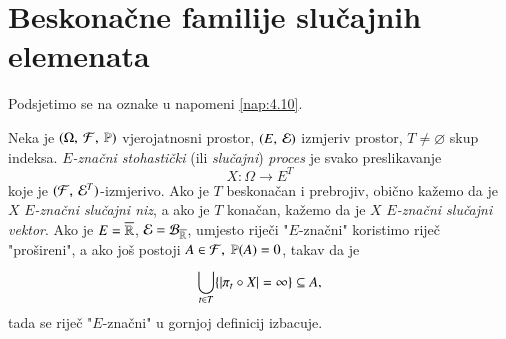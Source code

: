 
\chapter{Beskona\v cne familije slu\v cajnih elemenata}

Podsjetimo se na oznake u napomeni \ref{nap:4.10}.

\begin{defn}    \label{defn:8.1}
    Neka je $(\Omega, \: \mathcal{F}, \: \mathbb{P})$ vjerojatnosni prostor, $({E}, \: {\mathcal{E}})$ izmjeriv prostor, $T \neq \varnothing$ skup indeksa.
    \emph{$E$-zna\v cni stohasti\v cki} (ili \emph{slu\v cajni}) \emph{proces} je svako preslikavanje
    \begin{equation*}
        X : \Omega \to E^T
    \end{equation*}
    koje je $({\mathcal{F}}, \: {\mathcal{E}^T})$-izmjerivo.
    Ako je $T$ beskona\v can i prebrojiv, obi\v cno ka\v zemo da je $X$ \emph{$E$-zna\v cni slu\v cajni niz}, a ako je $T$ kona\v can, ka\v zemo da je $X$ \emph{$E$-zna\v cni slu\v cajni vektor}.
    Ako je $E = \overline{\mathbb{R}}$, $\mathcal{E} = \mathcal{B}_{\overline{\mathbb{R}}}$, umjesto rije\v ci "$E$-zna\v cni" koristimo rije\v c "pro\v sireni", a ako jo\v s postoji $A \in \mathcal{F}, \; \mathbb{P}({A}) = 0$, takav da je
    \begin{equation*}
        \bigcup\limits_{t \in T}^{} \{ |\pi_t \circ X| = \infty \} \subseteq A,
    \end{equation*}
    tada se rije\v c "$E$-zna\v cni" u gornjoj definicij izbacuje.
\end{defn}

